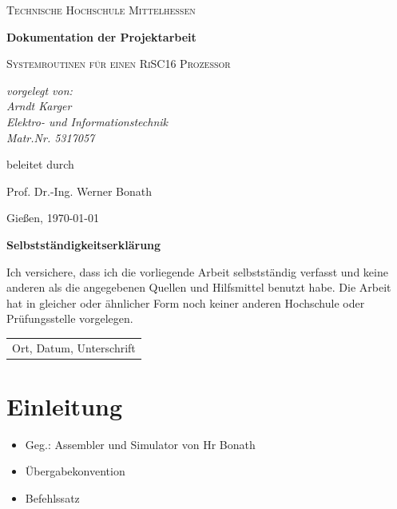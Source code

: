 \documentclass[fleqn, a4paper, 1pt]{article}       %
\begin{document}
\begin{titlepage}
	\centering
	{\scshape\LARGE Technische Hochschule Mittelhessen \par}
	\vspace{1cm}
	{\huge\bfseries Dokumentation der Projektarbeit \par}
	\vspace{1.5cm}
	{\scshape\Large Systemroutinen für einen RiSC16 Prozessor \par}
	\vspace{2cm}
	{\Large\itshape vorgelegt von: \\ Arndt Karger \\ Elektro-  und Informationstechnik\\ Matr.Nr. 5317057\par}
	\vfill
	beleitet durch\par
    Prof. Dr.-Ing. Werner Bonath
	\vfill

	{\large Gießen, \today\par}
\end{titlepage}

\thispagestyle{empty}
{\huge\bfseries Selbstständigkeitserklärung \par}
\vspace{1cm}

\noindent Ich versichere, dass ich die vorliegende Arbeit selbstständig verfasst und keine anderen als die angegebenen
Quellen und Hilfsmittel benutzt habe. Die Arbeit hat in gleicher oder ähnlicher Form noch keiner anderen
Hochschule oder Prüfungsstelle vorgelegen.

\vspace{4cm}
\begin{flushleft}
\begin{tabular}{@{}l@{}}\hline
Ort, Datum, Unterschrift
\end{tabular}
\end{flushleft}

\newpage
\thispagestyle{empty}
\tableofcontents
\newpage
\setcounter{page}{1}

\section{Einleitung}

\begin{itemize}
    \item Geg.: Assembler und Simulator von Hr Bonath
    \item Übergabekonvention
    \item Befehlssatz
\end{itemize}
\end{document}
